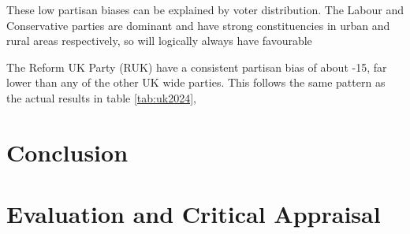 \documentclass{article}
\begin{document}
These low partisan biases can be explained by voter distribution. The Labour and Conservative parties are dominant and have strong constituencies in urban and rural areas
respectively, so will logically always have favourable 

The Reform UK Party (RUK) have a consistent partisan bias of about -15, far lower than any of the other UK wide parties. This follows the same pattern as the actual results in table 
\ref{tab:uk2024},



\section{Conclusion}

\section{Evaluation and Critical Appraisal}



\end{document}
